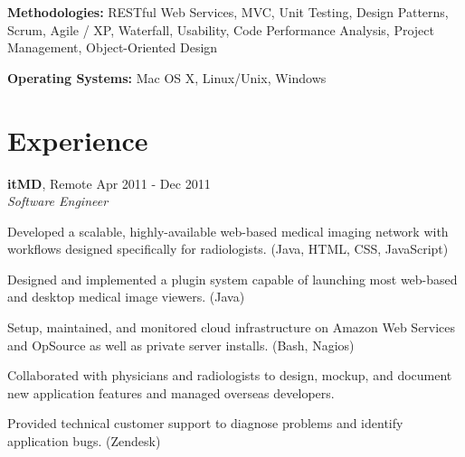 \documentclass[margin,line]{resume}
\begin{document}
\begin{resume}
  \textbf{Methodologies:} RESTful Web Services, MVC, Unit Testing,
  Design Patterns, Scrum, Agile / XP, Waterfall, Usability, Code
  Performance Analysis, Project Management, Object-Oriented Design
	\vspace{-2mm}

  \textbf{Operating Systems:} Mac OS X, Linux/Unix, Windows



  \section{\mysidestyle \textcolor{mySideColor}{Experience}}

  \textbf{itMD}, Remote \hfill Apr 2011 - Dec 2011\vspace{1mm}\\
  \textsl{Software Engineer}\\
  \vspace{-3mm}
  \begin{list2}
  \item Developed a scalable, highly-available web-based medical
    imaging network with workflows designed specifically for
    radiologists. (Java, HTML, CSS, JavaScript)
  \item Designed and implemented a plugin system capable of launching
    most web-based and desktop medical image viewers. (Java)
  \item Setup, maintained, and monitored cloud infrastructure on
    Amazon Web Services and OpSource as well as private server
    installs. (Bash, Nagios)
  \item Collaborated with physicians and radiologists to design,
    mockup, and document new application features and managed overseas
    developers.
  \item Provided technical customer support to diagnose problems and
    identify application bugs. (Zendesk)
  \end{list2}


\end{resume}
\end{document}
